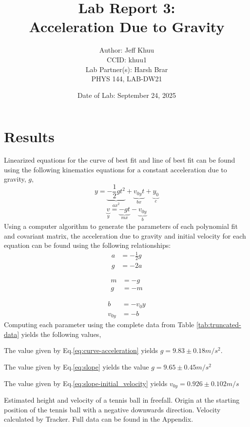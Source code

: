 \documentclass[titlepage]{article}
\title{%
Lab Report 3: \\ Acceleration Due to Gravity \\



}
\author{
\large Author: Jeff Khuu \\
CCID: khuu1 \\
Lab Partner(s): Harsh Brar \\
PHYS 144, LAB-DW21
}
\date{Date of Lab: September 24, 2025}
\begin{document}
\maketitle
\section{Results}

Linearized equations for the curve of best fit and line of best fit can be found using the following kinematics equations for a constant acceleration due to gravity, $g$,
$$ y = \underbrace{-\frac{1}{2}gt^2}_{ax^2} + \underbrace{v_{0y}t}_{bx} + \underbrace{y_0}_{c}  $$
$$ \underbrace{v}_{y} = \underbrace{-gt}_{mx} - \underbrace{v_{0y}}_{b} $$
Using a computer algorithm to generate the parameters of each polynomial fit and covariant matrix,
the acceleration due to gravity and initial velocity for each equation can be found using the following relationships:
\begin{equation}\label{eq:curve-acceleration}
   \begin{split}
      a & = -\frac{1}{2}g \\
      g & = -2a
   \end{split} 
\end{equation}

\begin{equation}\label{eq:slope}
   \begin{split}
      m &= -g \\
      g &= -m
   \end{split}
\end{equation}

\begin{equation}\label{eq:slope-initial_velocity}
   \begin{split}
      b &= -{v_0y} \\
      v_{0y} &= -b
   \end{split}
\end{equation}
Computing each parameter using the complete data from Table \ref{tab:truncated-data} yields the following values,

The value given by Eq.\ref{eq:curve-acceleration} yields $g = 9.83\pm 0.18 m/s^2$. 

The value given by Eq.\ref{eq:slope} yields the value $g = 9.65\pm0.45m/s^2$

The value given by Eq.\ref{eq:slope-initial_velocity} yields $v_{0y} = 0.926\pm0.102m/s$


\begin{table}[h]
   \caption{Estimated height and velocity of a tennis ball in freefall. Origin at the starting position of the tennis ball with a negative downwards direction. Velocity calculated by Tracker. Full data can be found in the Appendix.}
   \label{tab:truncated-data}
   \begin{center}
   \end{center}
\end{table}
\end{document}
